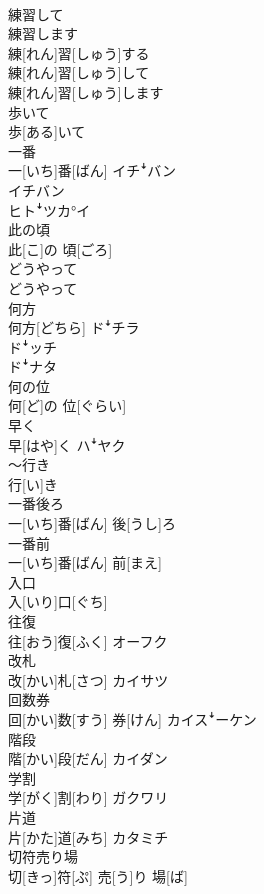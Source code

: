 \documentclass[8pt]{extreport}
\begin{document}
\begin{CJK}{UTF8}{min}
\\	練習して 
\\	練習します	
\\	練[れん]習[しゅう]する 
\\	練[れん]習[しゅう]して 
\\	練[れん]習[しゅう]します	
\\	歩いて	
\\	歩[ある]いて	
\\	一番	
\\	一[いち]番[ばん]	イチꜜバン 
\\	イチバン 
\\	ヒトꜜツカ°イ
\\	此の頃	
\\	此[こ]の 頃[ごろ]	
\\	どうやって	
\\	どうやって	
\\	何方	
\\	何方[どちら]	ドꜜチラ 
\\	ドꜜッチ 
\\	ドꜜナタ
\\	何の位	
\\	何[ど]の 位[ぐらい]	
\\	早く	
\\	早[はや]く	ハꜜヤク
\\	～行き	
\\	行[い]き	
\\	一番後ろ	
\\	一[いち]番[ばん] 後[うし]ろ	
\\	一番前	
\\	一[いち]番[ばん] 前[まえ]	
\\	入口	
\\	入[いり]口[ぐち]	
\\	往復	
\\	往[おう]復[ふく]	オーフク
\\	改札	
\\	改[かい]札[さつ]	カイサツ
\\	回数券	
\\	回[かい]数[すう] 券[けん]	カイスꜜーケン
\\	階段	
\\	階[かい]段[だん]	カイダン
\\	学割	
\\	学[がく]割[わり]	ガクワリ
\\	片道	
\\	片[かた]道[みち]	カタミチ
\\	切符売り場	
\\	切[きっ]符[ぷ] 売[う]り 場[ば]	

\end{CJK}
\end{document}
